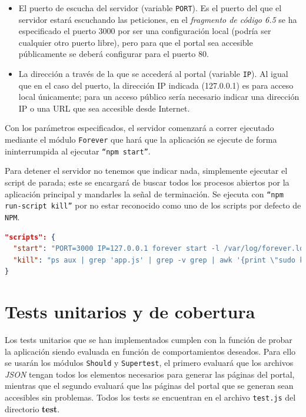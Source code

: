\begin{itemize}
	\item  El puerto de escucha del servidor (variable {\tt PORT}). Es el puerto del que el servidor estará escuchando las peticiones, en el \textit{fragmento de código 6.5} se ha especificado el puerto 3000 por ser una configuración local (podría ser cualquier otro puerto libre), pero para que el portal sea accesible públicamente se deberá configurar para el puerto 80.
	\item La dirección a través de la que se accederá al portal (variable {\tt IP}). Al igual que en el caso del puerto, la dirección IP indicada (127.0.0.1) es para acceso local únicamente; para un acceso público sería necesario indicar una dirección IP o una URL que sea accesible desde Internet.
\end{itemize}

Con los parámetros especificados, el servidor comenzará a correr ejecutado mediante el módulo {\tt Forever} que hará que la aplicación se ejecute de forma ininterrumpida al ejecutar {\tt ``npm start''}.

\bigskip
Para detener el servidor no tenemos que indicar nada, simplemente ejecutar el script de parada; este se encargará de buscar todos los procesos abiertos por la aplicación principal y mandarles la señal de terminación. Se ejecuta con {\tt ``npm run-script kill''} por no estar reconocido como uno de los scripts por defecto de {\tt NPM}.

\begin{lstlisting}[language=json,caption={Scripts de inicio y detención},label={lst:ini_para}]
"scripts": {
  "start": "PORT=3000 IP=127.0.0.1 forever start -l /var/log/forever.log -a -o /var/log/out.log -e /var/log/err.log ./app.js",
  "kill": "ps aux | grep 'app.js' | grep -v grep | awk '{print \"sudo kill -9 \" $2}' | sh"
}
\end{lstlisting}

\section{Tests unitarios y de cobertura}

Los tests unitarios que se han implementados cumplen con la función de probar la aplicación siendo evaluada en función de comportamientos deseados. Para ello se usarán los módulos {\tt Should} y {\tt Supertest}, el primero evaluará que los archivos \textit{JSON} tengan todos los elementos necesarios para generar las páginas del portal, mientras que el segundo evaluará que las páginas del portal que se generan sean accesibles sin problemas. Todos los tests se encuentran en el archivo {\tt test.js} del directorio \textbf{test}.

